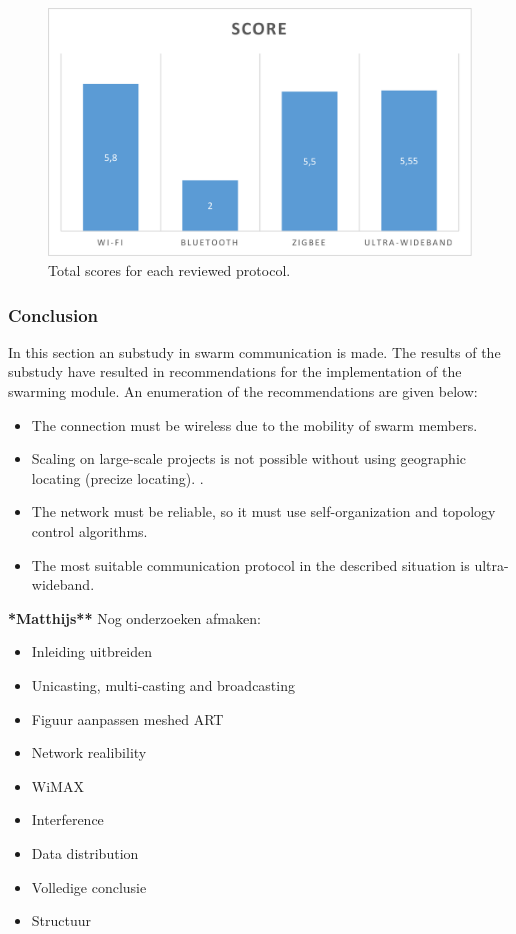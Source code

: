\documentclass[10pt,a4paper]{article}
\begin{document}
\begin{figure}[H]
   \centering
   \includegraphics[width=1\textwidth]{protocolcomparison}
   \caption{Total scores for each reviewed protocol.}
   \label{fig:protocolcomparison}
\end{figure}



\subsubsection{Conclusion}
In this section an substudy in swarm communication is made. The results of the substudy have resulted in recommendations for the implementation of the swarming module. An enumeration of the recommendations are given below:
\begin{itemize}
\setlength\itemsep{0em}
    \item The connection must be wireless due to the mobility of swarm members.
    \item Scaling on large-scale projects is not possible without using geographic locating (precize locating). \cite{geographicalrouting}\cite{scalablelocation}. 
    \item The network must be reliable, so it must use self-organization and topology control algorithms. \cite{WMN1}
    \item The most suitable communication protocol in the described situation is ultra-wideband.
\end{itemize}

\textbf{\Large **Matthijs**}
Nog onderzoeken afmaken:
\begin{itemize}
\setlength\itemsep{0em}
    \item Inleiding uitbreiden
    \item Unicasting, multi-casting and broadcasting
    \item Figuur aanpassen meshed ART
    \item Network realibility
    \item WiMAX
    \item Interference
    \item Data distribution
    \item Volledige conclusie
    \item Structuur
\end{itemize}
\end{document}
